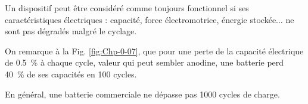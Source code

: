 Un dispositif peut être considéré comme toujours fonctionnel si ses caractéristiques électriques : capacité, force électromotrice, énergie stockée$\ldots$ ne sont pas dégradés malgré le cyclage.

On remarque à la Fig. \ref{fig:Chp-0-07}, que pour une perte de la capacité électrique de \SI{0.5}{\percent} à chaque cycle, valeur qui peut sembler anodine, une batterie perd \SI{40}{\percent} de ses capacités en 100 cycles.

\begin{minipage}{0.65\textwidth}

\end{minipage} \hfill \begin{minipage}{0.25\textwidth}
\label{fig:Chp-0-07}
\end{minipage}

En général, une batterie commerciale ne dépasse pas 1000 cycles de charge.

